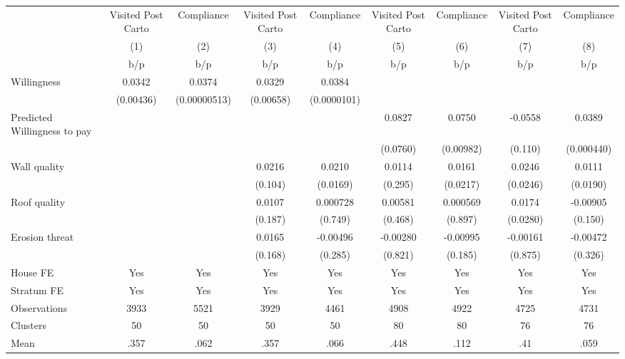 {
\def\sym#1{\ifmmode^{#1}\else\(^{#1}\)\fi}
\begin{tabular}{l*{8}{c}}
\toprule
                &\multicolumn{1}{c}{Visited Post Carto}&\multicolumn{1}{c}{Compliance}&\multicolumn{1}{c}{Visited Post Carto}&\multicolumn{1}{c}{Compliance}&\multicolumn{1}{c}{Visited Post Carto}&\multicolumn{1}{c}{Compliance}&\multicolumn{1}{c}{Visited Post Carto}&\multicolumn{1}{c}{Compliance}\\
                &\multicolumn{1}{c}{(1)}&\multicolumn{1}{c}{(2)}&\multicolumn{1}{c}{(3)}&\multicolumn{1}{c}{(4)}&\multicolumn{1}{c}{(5)}&\multicolumn{1}{c}{(6)}&\multicolumn{1}{c}{(7)}&\multicolumn{1}{c}{(8)}\\
                &      b/p&      b/p&      b/p&      b/p&      b/p&      b/p&      b/p&      b/p\\
\midrule
Willingness     &   0.0342&   0.0374&   0.0329&   0.0384&         &         &         &         \\
                &(0.00436)&(0.00000513)&(0.00658)&(0.0000101)&         &         &         &         \\
Predicted Willingness to pay&         &         &         &         &   0.0827&   0.0750&  -0.0558&   0.0389\\
                &         &         &         &         & (0.0760)&(0.00982)&  (0.110)&(0.000440)\\
Wall quality    &         &         &   0.0216&   0.0210&   0.0114&   0.0161&   0.0246&   0.0111\\
                &         &         &  (0.104)& (0.0169)&  (0.295)& (0.0217)& (0.0246)& (0.0190)\\
Roof quality    &         &         &   0.0107& 0.000728&  0.00581& 0.000569&   0.0174& -0.00905\\
                &         &         &  (0.187)&  (0.749)&  (0.468)&  (0.897)& (0.0280)&  (0.150)\\
Erosion threat  &         &         &   0.0165& -0.00496& -0.00280& -0.00995& -0.00161& -0.00472\\
                &         &         &  (0.168)&  (0.285)&  (0.821)&  (0.185)&  (0.875)&  (0.326)\\
House FE        &      Yes&      Yes&      Yes&      Yes&      Yes&      Yes&      Yes&      Yes\\
Stratum FE      &      Yes&      Yes&      Yes&      Yes&      Yes&      Yes&      Yes&      Yes\\
\midrule
Observations    &     3933&     5521&     3929&     4461&     4908&     4922&     4725&     4731\\
Clusters        &       50&       50&       50&       50&       80&       80&       76&       76\\
Mean            &     .357&     .062&     .357&     .066&     .448&     .112&      .41&     .059\\
\bottomrule
\end{tabular}
}
